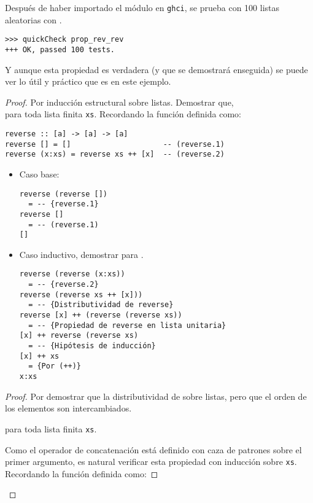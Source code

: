 Después de haber importado el módulo  en \texttt{ghci}, se prueba con 100
listas aleatorias con .
\begin{verbatim}
>>> quickCheck prop_rev_rev
+++ OK, passed 100 tests.
\end{verbatim}

Y aunque esta propiedad es verdadera (y que se demostrará enseguida) se puede ver lo útil y
práctico que es \QuickCheck en este ejemplo.

\begin{proof}
Por inducción estructural sobre listas. Demostrar que,\\
 para toda lista finita \texttt{xs}.
\hfill \break
Recordando la función  definida como:

\begin{verbatim}
reverse :: [a] -> [a] -> [a]
reverse [] = []                     -- (reverse.1)
reverse (x:xs) = reverse xs ++ [x]  -- (reverse.2)
\end{verbatim}

\begin{itemize}
\item Caso base:
\begin{verbatim}
reverse (reverse [])
  = -- {reverse.1}
reverse []
  = -- (reverse.1)
[]
\end{verbatim}

\item Caso inductivo, demostrar para .
\begin{verbatim}
reverse (reverse (x:xs))
  = -- {reverse.2}
reverse (reverse xs ++ [x]))
  = -- {Distributividad de reverse}
reverse [x] ++ (reverse (reverse xs))
  = -- {Propiedad de reverse en lista unitaria}
[x] ++ reverse (reverse xs)
  = -- {Hipótesis de inducción}
[x] ++ xs
  = {Por (++)}
x:xs
\end{verbatim}
\end{itemize}


\begin{proof}
Por demostrar que la distributividad de  sobre listas, pero que el orden de los
elementos son intercambiados.

 para toda lista finita \texttt{xs}.

Como el operador de concatenación \hsCode{++} está definido con caza de patrones sobre el primer
argumento, es natural verificar esta propiedad con inducción sobre \texttt{xs}.
Recordando la función \hsCode{(++)} definida como:


\end{proof}
\end{proof}
